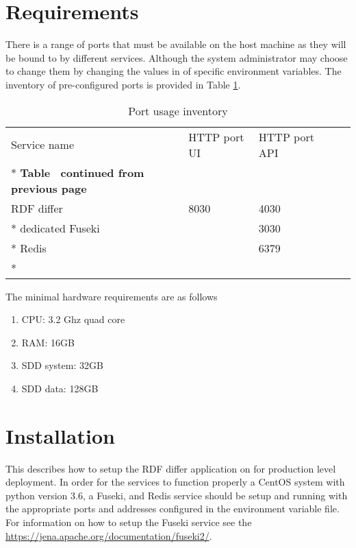 \section{Requirements}
\label{sec:requirements}
There is a range of ports that must be available on the host machine as they will be bound to by different services. Although the system administrator may choose to change them by changing the values in of specific environment variables. The inventory of pre-configured ports is provided in Table \ref{tab:port-inventory}.

\begin{longtable}[c]{@{}p{3.64cm}p{1.25cm}p{1.25cm}p{1.9cm}p{5cm}@{}}
	\toprule
	Service name     & HTTP port UI & HTTP port API             \\* \midrule
	\endfirsthead
	\multicolumn{5}{c}%
	{{\bfseries Table \thetable\ continued from previous page}} \\
	\endhead
	\bottomrule
	\endfoot
	\endlastfoot
	RDF differ       & 8030         & 4030                      \\* \hline
	dedicated Fuseki &              & 3030                      \\* \hline
	Redis            &              & 6379                      \\* \bottomrule
	\caption{Port usage inventory}
	\label{tab:port-inventory}                                  \\
\end{longtable}

The minimal hardware requirements are as follows 
\begin{enumerate}
	\item CPU: 3.2 Ghz quad core
	\item RAM: 16GB
	\item SDD system: 32GB
	\item SDD data: 128GB
\end{enumerate}

\section{Installation}
\label{sec:installation}
This describes how to setup the RDF differ application on for production level deployment.
In order for the services to function properly a CentOS system with python version 3.6, a Fuseki, and Redis service should be setup and running with the appropriate ports and addresses configured in the environment variable file. For information on how to setup the Fuseki service see the \url{https://jena.apache.org/documentation/fuseki2/}.

